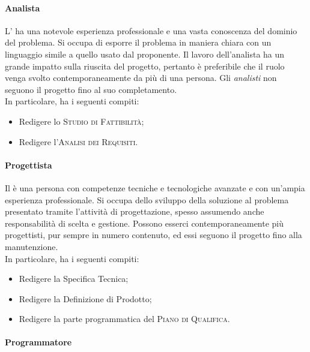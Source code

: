 \paragraph{Analista}

L'\emph{} ha una notevole esperienza professionale e una vasta conoscenza del dominio del problema. 
Si occupa di esporre il problema in maniera chiara con un linguaggio simile a quello usato dal proponente. Il lavoro 
dell'analista ha un grande impatto sulla riuscita del progetto, pertanto è preferibile che il ruolo venga svolto 
contemporaneamente da più di una persona. 
Gli \emph{analisti} non seguono il progetto fino al suo completamento.\\
In particolare, ha i seguenti compiti:
\begin{itemize} 
    \item Redigere lo \textsc{Studio di Fattibilità};
    \item Redigere l'\textsc{Analisi dei Requisiti}.
\end{itemize}

\paragraph{Progettista}

Il \emph{} è una persona con competenze tecniche e tecnologiche avanzate e con un'ampia 
esperienza professionale. Si occupa dello sviluppo della soluzione al problema presentato tramite l'attività di 
progettazione, spesso assumendo anche responsabilità di scelta e gestione. Possono esserci contemporaneamente più 
progettisti, pur sempre in numero contenuto, ed essi seguono il progetto fino alla manutenzione.\\
In particolare, ha i seguenti compiti:
\begin{itemize}
    \item Redigere la Specifica Tecnica;
    \item Redigere la Definizione di Prodotto;
    \item Redigere la parte programmatica del \textsc{Piano di Qualifica}.
\end{itemize}

\paragraph{Programmatore}


